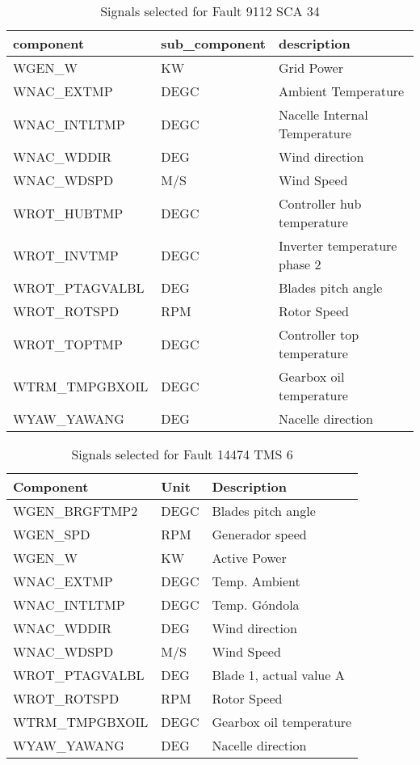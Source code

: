 \begin{table}[h!t]
    \centering
    \begin{tabular}{|l|l|l|}
    \hline
        component & sub\_component & description \\ \hline
        WGEN\_W & KW & Grid Power \\ \hline
        WNAC\_EXTMP & DEGC & Ambient Temperature \\ \hline
        WNAC\_INTLTMP & DEGC & Nacelle Internal Temperature \\ \hline
        WNAC\_WDDIR & DEG & Wind direction \\ \hline
        WNAC\_WDSPD & M/S & Wind Speed \\ \hline
        WROT\_HUBTMP & DEGC & Controller hub temperature \\ \hline
        WROT\_INVTMP & DEGC & Inverter temperature phase 2 \\ \hline
        WROT\_PTAGVALBL & DEG & Blades pitch angle \\ \hline
        WROT\_ROTSPD & RPM & Rotor Speed \\ \hline
        WROT\_TOPTMP & DEGC & Controller top temperature \\ \hline
        WTRM\_TMPGBXOIL & DEGC & Gearbox oil temperature \\ \hline
        WYAW\_YAWANG & DEG & Nacelle direction \\ \hline
    \end{tabular}
    \caption{Signals selected for Fault 9112 SCA 34}
\end{table}

\begin{table}[h!t]
    \centering
    \begin{tabular}{|l|l|l|}
    \hline
        Component & Unit & Description \\ \hline
        WGEN\_BRGFTMP2 & DEGC & Blades pitch angle \\ \hline
        WGEN\_SPD & RPM & Generador speed \\ \hline
        WGEN\_W & KW & Active Power \\ \hline
        WNAC\_EXTMP & DEGC & Temp. Ambient \\ \hline
        WNAC\_INTLTMP & DEGC & Temp. Góndola \\ \hline
        WNAC\_WDDIR & DEG & Wind direction \\ \hline
        WNAC\_WDSPD & M/S & Wind Speed \\ \hline
        WROT\_PTAGVALBL & DEG & Blade 1, actual value A \\ \hline
        WROT\_ROTSPD & RPM & Rotor Speed \\ \hline
        WTRM\_TMPGBXOIL & DEGC & Gearbox oil temperature \\ \hline
        WYAW\_YAWANG & DEG & Nacelle direction \\ \hline
    \end{tabular}
    \caption{Signals selected for Fault 14474 TMS 6}
\end{table}
